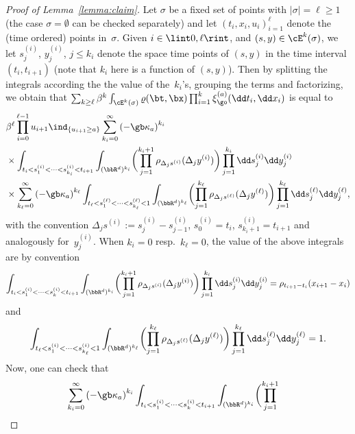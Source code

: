 \begin{proof}[Proof of Lemma~\ref{lemma:claim}]
Let $\sigma$ be a fixed set of points with $|\sigma|=\ell \geq 1$ (the case $\sigma=\emptyset$ can be checked separately) and let $(t_i,x_i,u_i)_{i=1}^{\ell}$ denote the (time ordered) points in~$\sigma$.
Given $i\in \lint 0,\ell\rint$, and $(s,y)\in \cE^k(\sigma)$,
we let $s^{(i)}_j$, $y^{(i)}_j$, $j\le k_i$ denote the space time points of
$(s,y)$ in the time interval $(t_i,t_{i+1})$ (note that $k_i$ here is a function of $(s,y)$). Then by splitting the integrals according the the value of the~$k_i$'s, grouping the terms and factorizing, we obtain that $ \sum_{k\ge \ell} \beta^k \int_{ \cE^k(\sigma)} \varrho (\bt,\bx) \prod_{i=1}^k \xi_{\go}^{(a)}(\dd t_i,\dd x_i) $ is equal to
\begin{equation*}
\label{horbltrk}
\begin{split}
& \beta^{\ell}\prod_{i=0}^{\ell-1} u_{i+1} \ind_{\{u_{i+1} \geq a \}} \sum_{k_i=0}^\infty
\left(- \gb \kappa_a \right)^{k_i} \\
&\times \int_{t_{i}<s^{(i)}_1<\dots<s^{(i)}_{ k_i}<t_{i+1}}\int_{(\bbR^d)^{k_i}}\biggl(\prod_{j=1}^{k_i+1}
\rho_{\Delta_j s^{(i)}}(\Delta_j y^{(i)}) \biggr) \prod_{j=1}^{k_i}\dd s^{(i)}_j \dd y^{(i)}_j \\
& \times \sum_{k_{\ell}=0}^\infty
\left(-\gb\kappa_a \right)^{k_{\ell}} \int_{t_{\ell}<s^{ (\ell)}_1<\dots<s^{ (\ell)}_{k_{\ell}}<1}\int_{(\bbR^d)^{k_{\ell}}} \biggl(\prod_{j=1}^{k_{\ell}}
\rho_{\Delta_j s^{(\ell)}}(\Delta_j y^{(\ell)}) \biggr) \prod_{j=1}^{k_{\ell}} \dd s^{(\ell)}_j \dd y^{(\ell)}_j,
\end{split}
\end{equation*}
with the convention $\Delta_j s^{(i)}:= s^{(i)}_{j}-s^{(i)}_{j-1} $,
$s^{(i)}_0=t_{i}$, $s^{(i)}_{k_{i}+1}=t_{i+1}$ and analogously for~$y^{(i)}_{j}$. When $k_i=0$ resp.\ $k_{\ell}=0$, the value of the above integrals are by convention
\[
\int_{t_{i}<s^{(i)}_1<\dots<s^{(i)}_k<t_{i+1}}\int_{(\bbR^d)^{k_i}} \biggl(\prod_{j=1}^{k_i+1}
\rho_{\Delta_j s^{(i)}}(\Delta_j y^{(i)}) \biggr) \prod_{j=1}^{k_i}\dd s^{(i)}_j \dd y^{(i)}_j=\rho_{t_{i+1}-t_i}(x_{i+1}-x_i)
\]
and
\[
\int_{t_{\ell}<s^{(i)}_1<\dots<s^{(i)}_{k_{\ell}}<1}\int_{(\bbR^d)^{k_{\ell}}} \biggl(\prod_{j=1}^{k_{\ell}}
\rho_{\Delta_j s^{(\ell)}}(\Delta_j y^{(\ell)}) \biggr) \prod_{j=1}^{k_{\ell}} \dd s^{(\ell)}_j \dd y^{(\ell)}_j =1.
\]
Now, one can check that
\begin{align*}
\sum_{k_i=0}^\infty
\left(-\gb\kappa_a \right)^{k_i} &
\int_{t_{i}<s^{(i)}_1<\dots<s^{(i)}_k<t_{i+1}}\int_{(\bbR^d)^{k_i}} \biggl(\prod_{j=1}^{k_i+1}

\end{align*}
\end{proof}

